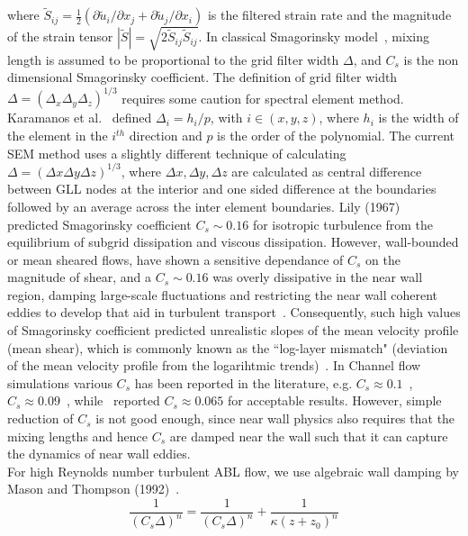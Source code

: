 \documentclass[times]{fldauth}
\begin{document}
where $\widetilde{S}_{ij} = \frac{1}{2}({\partial \widetilde{u}_i}/{\partial x_j}+ {\partial \widetilde{u}_j}/{\partial x_i})$ is the filtered strain rate and the magnitude of the strain tensor $|\widetilde{S}| = \sqrt{2\widetilde{S}_{ij}\widetilde{S}_{ij}}$. In classical Smagorinsky model~\cite{smagorinsky}, mixing length is assumed to be proportional to the grid filter width $\Delta$, and $C_s$ is the non dimensional Smagorinsky coefficient. The definition of grid filter width $\Delta = (\Delta_x\Delta_y\Delta_z)^{1/3}$ requires some caution for spectral element method. Karamanos et al.~\cite{karamanos} defined $\Delta_i = h_i/p$, with $i\in (x,y,z)$, where $h_i$ is the width of the element in the $i^{th}$ direction and $p$ is the order of the polynomial. The current SEM method uses a slightly different technique of calculating $\Delta = (\Delta x\Delta y\Delta z)^{1/3}$, where $\Delta x, \Delta y, \Delta z$ are calculated as central difference between GLL nodes at the interior and one sided difference at the boundaries followed by an average across the inter element boundaries. Lily (1967)~\cite{lily0} predicted Smagorinsky coefficient $C_s \sim 0.16$ for isotropic turbulence from the equilibrium of subgrid dissipation and viscous dissipation. However, wall-bounded or mean sheared flows, have shown a sensitive dependance of $C_s$ on the magnitude of shear, and a $C_s \sim 0.16$  was overly dissipative in the near wall region, damping large-scale fluctuations and restricting the near wall coherent eddies to develop that aid in turbulent transport~\cite{hor,bers}. Consequently, such high values of Smagorinsky coefficient predicted unrealistic slopes of the mean velocity profile (mean shear), which is commonly known as the ``log-layer mismatch" (deviation of the mean velocity profile from the logarihtmic trends)~\cite{andren,meyers2}. In Channel flow simulations various $C_s$ has been reported in the literature, e.g. $C_s \approx 0.1$~\cite{deardoff}, $C_s \approx 0.09$~\cite{bardina2}, while~\cite{moin1} reported $C_s \approx 0.065$ for acceptable results. However, simple reduction of $C_s$ is not good enough, since near wall physics also requires that the mixing lengths and hence $C_s$ are damped near the wall such that it can capture the dynamics of near wall eddies.\\
For high Reynolds number turbulent ABL flow, we use algebraic wall damping by Mason and Thompson (1992)~\cite{mason}.
\begin{equation}
\frac{1}{(C_s\Delta)^{n}} = \frac{1}{(C_s\Delta)^{n}} + \frac{1}{\kappa(z + z_0)^{n}} \label{mas}
\end{equation} 
\end{document}
